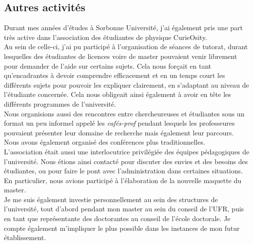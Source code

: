 \documentclass[a4paper,11pt]{article} %
\newcommand{\pointmedian}{\fontfamily{cmr}\selectfont\textperiodcentered}
\begin{document}
	\subsection{Autres activités}
	Durant mes années d'études à Sorbonne Université, j'ai également pris une part très active dans l'association des étudiant\pointmedian es de physique CurieOsity.\\ 
	Au sein de celle-ci, j'ai pu participé à l'organisation de séances de tutorat, durant lesquelles des étudiant\pointmedian es de licences voire de master pouvaient venir librement pour demander de l'aide sur certains sujets. Cela nous forçait en tant qu'encadrant\pointmedian es à devoir comprendre efficacement et en un temps court les différents sujets pour pouvoir les expliquer clairement, en s'adaptant au niveau de l'étudiant\pointmedian e concerné\pointmedian e. Cela nous obligeait ainsi également à avoir en tête les différents programmes de l'université.\\
	Nous organisions aussi des rencontres entre chercheur\pointmedian euses et étudiant\pointmedian es sous un format un peu informel appelé les \textit{cafés-prof} pendant lesquels les professeur\pointmedian es pouvaient présenter leur domaine de recherche mais également leur parcours. Nous avons également organisé des conférences plus traditionnelles.\\
	L'association était aussi une interlocutrice privilégiée des équipes pédagogiques de l'université. Nous étions ainsi contacté pour discuter des envies et des besoins des étudiant\pointmedian es, ou pour faire le pont avec l'administration dans certaines situations. En particulier, nous avions participé à l'élaboration de la nouvelle maquette du master.\\
	
	Je me suis également investie personnellement au sein des structures de l'université, tout d'abord pendant mon master au sein du conseil de l'UFR, puis en tant que représentante des doctorant\pointmedian es au conseil de l'école doctorale. Je compte également m'impliquer le plus possible dans les instances de mon futur établissement.
	
	
\end{document}
